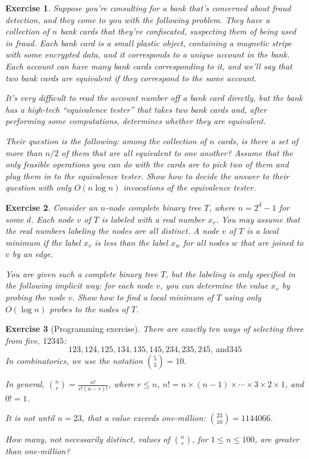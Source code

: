 \documentclass[11pt]{amsart}
\theoremstyle{theorem}
\newtheorem{exercise}{Exercise}
\begin{document}
\begin{exercise}
Suppose you're consulting for a bank that's concerned about fraud detection, and they come to you with the following problem. They have a collection of $n$ bank cards that they've confiscated, suspecting them of being used in fraud. Each bank card is a small plastic object, containing a magnetic stripe with some encrypted data, and it corresponds to a unique account in the bank. Each account can have many bank cards corresponding to it, and we'll say that two bank cards are \emph{equivalent} if they correspond to the same account.

It's very difficult to read the account number off a bank card directly, but the bank has a high-tech ``equivalence tester'' that takes two bank cards and, after performing some computations, determines whether they are equivalent.

Their question is the following: among the collection of $n$ cards, is there a set of more than $n/2$ of them that are all equivalent to one another? Assume that the only feasible operations you can do with the cards are to pick two of them and plug them in to the equivalence tester. Show how to decide the answer to their question with only $O(n\log n)$ invocations of the equivalence tester.
\end{exercise}

\begin{exercise}
Consider an $n$-node complete binary tree $T$, where $n=2^d-1$ for some $d$. Each node $v$ of $T$ is labeled with a real number $x_v$. You may assume that the real numbers labeling the nodes are all distinct. A node $v$ of $T$ is a \emph{local minimum} if the label $x_v$ is less than the label $x_w$ for all nodes $w$ that are joined to $v$ by an edge.

You are given such a complete binary tree $T$, but the labeling is only specified in the following \emph{implicit} way: for each node $v$, you can determine the value $x_v$ by \emph{probing} the node $v$. Show how to find a local minimum of $T$ using only $O(\log n)$ \emph{probes} to the nodes of $T$.
\end{exercise}


\begin{exercise}[Programming exercise]
There are exactly ten ways of selecting three from five, $12345$:
\[
123, 124, 125, 134, 135, 145, 234, 235, 245, \ \text{and} 345
\]
In combinatorics, we use the notation ${5\choose 3}=10$.

In general, ${n\choose r} = \frac{n!}{r!(n-r)!}$, where $r\leq n$, $n!=n\times (n-1)\times\cdots\times 3\times 2\times 1$, and $0!=1$.

It is not until $n=23$, that a value exceeds one-million: ${23\choose 10} = 1144066$.

How many, not necessarily distinct, values of ${n\choose r}$, for $1\leq n\leq 100$, are greater than one-million?
\end{exercise}
\end{document}
